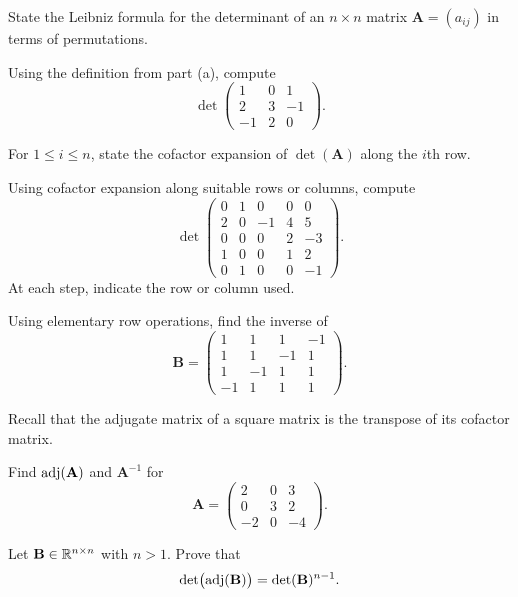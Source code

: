 \begin{problem}
\begin{problemsubparts}
\item State the Leibniz formula for the determinant of an $n\times n$ matrix $\mathbf A=(a_{ij})$ in terms of permutations.
\item Using the definition from part \textup{(a)}, compute
\[
\det\begin{pmatrix}
1&0&1\\
2&3&-1\\
-1&2&0
\end{pmatrix}.
\]
\item For $1\le i\le n$, state the cofactor expansion of $\det(\mathbf A)$ along the $i$th row.
\item Using cofactor expansion along suitable rows or columns, compute
\[
\det\begin{pmatrix}
0&1&0&0&0\\
2&0&-1&4&5\\
0&0&0&2&-3\\
1&0&0&1&2\\
0&1&0&0&-1
\end{pmatrix}.
\]
At each step, indicate the row or column used.
\item Using elementary row operations, find the inverse of
\[
\mathbf B=
\begin{pmatrix}
1&1&1&-1\\
1&1&-1&1\\
1&-1&1&1\\
-1&1&1&1
\end{pmatrix}.
\]
\end{problemsubparts}
\end{problem}

\begin{problem}
Recall that the adjugate matrix of a square matrix is the transpose of its cofactor matrix.
\begin{problemsubparts}
\item Find $\operatorname{adj}(\mathbf A)$ and $\mathbf A^{-1}$ for
\[
\mathbf A=
\begin{pmatrix}
2&0&3\\
0&3&2\\
-2&0&-4
\end{pmatrix}.
\]
\item Let $\mathbf B\in\mathbb{R}^{n\times n}$ with $n>1$. Prove that
\[
\det\bigl(\operatorname{adj}(\mathbf B)\bigr)=\det(\mathbf B)^{n-1}.
\]
\end{problemsubparts}
\end{problem}


